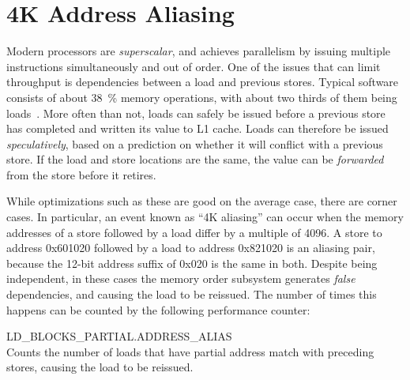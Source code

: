 \documentclass[a4paper,10pt,twocolumn,twoside]{article}
\begin{document}
\section{4K Address Aliasing}
Modern processors are \emph{superscalar}, and achieves parallelism by issuing multiple instructions simultaneously and out of order.
One of the issues that can limit throughput is dependencies between a load and previous stores.
Typical software consists of about 38~\% memory operations, with about two thirds of them being loads~\cite{Intel:2006:InsideICM:SmartMemoryAccess}.
More often than not, loads can safely be issued before a previous store has completed and written its value to L1 cache.
Loads can therefore be issued \emph{speculatively}, based on a prediction on whether it will conflict with a previous store.
If the load and store locations are the same, the value can be \emph{forwarded} from the store before it retires.

While optimizations such as these are good on the average case, there are corner cases. 
In particular, an event known as ``4K aliasing'' can occur when the memory addresses of a store followed by a load differ by a multiple of 4096.
A store to address 0x601020 followed by a load to address 0x821020 is an aliasing pair, because the 12-bit address suffix of 0x020 is the same in both. 
Despite being independent, in these cases the memory order subsystem generates \emph{false} dependencies, and causing the load to be reissued.
The number of times this happens can be counted by the following performance counter:
\begin{description}
  \item{LD\_BLOCKS\_PARTIAL.ADDRESS\_ALIAS} \hfill \\
  Counts the number of loads that have partial address match with preceding stores, causing the load to be reissued.~\cite{Intel:2012:OptimizationManual}
\end{description}
\end{document}
